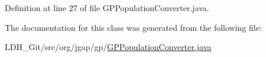 Definition at line 27 of file G\-P\-Population\-Converter.\-java.



The documentation for this class was generated from the following file\-:\begin{DoxyCompactItemize}
\item 
L\-D\-H\-\_\-\-Git/src/org/jgap/gp/\hyperlink{_g_p_population_converter_8java}{G\-P\-Population\-Converter.\-java}\end{DoxyCompactItemize}
